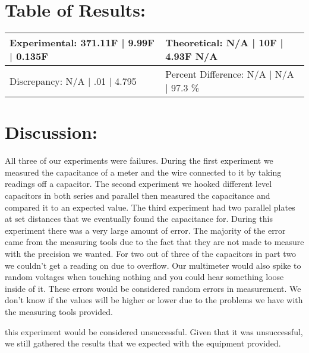 \documentclass{article}
\begin{document}
\section*{Table of Results:}
\begin{center}
\begin{tabular}{|l|l|}
\hline
	Experimental: 371.11F | 9.99F | 0.135F & Theoretical: N/A | 10F | 4.93F N/A  \\ \hline
	Discrepancy: N/A | .01 | 4.795   & Percent Difference: N/A | N/A | 97.3 \% \\
\hline
\end{tabular}
\end{center}

\section*{Discussion:}
\doublespace
All three of our experiments were failures.  During the first experiment we measured the capacitance of a meter and the wire connected to it by taking readings off a capacitor.  The second experiment we hooked different level capacitors in both series and parallel then measured the capacitance and compared it to an expected value.  The third experiment had two parallel plates at set distances that we eventually found the capacitance for.  
  During this experiment there was a very large amount of error.  The majority of the error came from the measuring tools due to the fact that they are not made to measure with the precision we wanted.  For two out of three of the capacitors in part two we couldn't get a reading on due to overflow.  Our multimeter would also spike to random voltages when touching nothing and you could hear something loose inside of it.  These errors would be considered random errors in measurement.  We don't know if the values will be higher or lower due to the problems we have with the measuring tools provided.  \par 
  this experiment would be considered unsuccessful.  Given that it was unsuccessful, we still gathered the results that we expected with the equipment provided.
  
\end{document}
